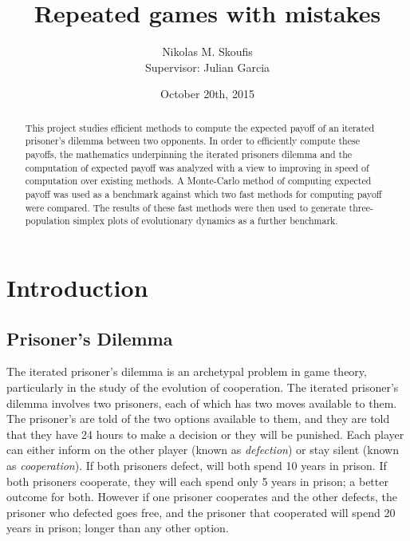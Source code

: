 \documentclass[a4paper,12pt]{article}
\begin{document}
\title{Repeated games with mistakes}
\author{Nikolas M. Skoufis \\ Supervisor: Julian Garcia}
\date{October 20th, 2015}

\maketitle

\begin{abstract}

This project studies efficient methods to compute the expected payoff of an iterated prisoner's dilemma between two opponents.
In order to efficiently compute these payoffs, the mathematics underpinning the iterated prisoners dilemma and the computation of expected payoff was analyzed with a view to improving in speed of computation over existing methods.
A Monte-Carlo method of computing expected payoff was used as a benchmark against which two fast methods for computing payoff were compared.
The results of these fast methods were then used to generate three-population simplex plots of evolutionary dynamics as a further benchmark.

\end{abstract}

\section*{Introduction}

\subsection*{Prisoner's Dilemma}

The iterated prisoner's dilemma is an archetypal problem in game theory, particularly in the study of the evolution of cooperation.
The iterated prisoner's dilemma involves two prisoners, each of which has two moves available to them.
The prisoner's are told of the two options available to them, and they are told that they have 24 hours to make a decision or they will be punished.
Each player can either inform on the other player (known as \textit{defection}) or stay silent (known as \textit{cooperation}).
If both prisoners defect, will both spend 10 years in prison.
If both prisoners cooperate, they will each spend only 5 years in prison; a better outcome for both.
However if one prisoner cooperates and the other defects, the prisoner who defected goes free, and the prisoner that cooperated will spend 20 years in prison; longer than any other option.
\end{document}
